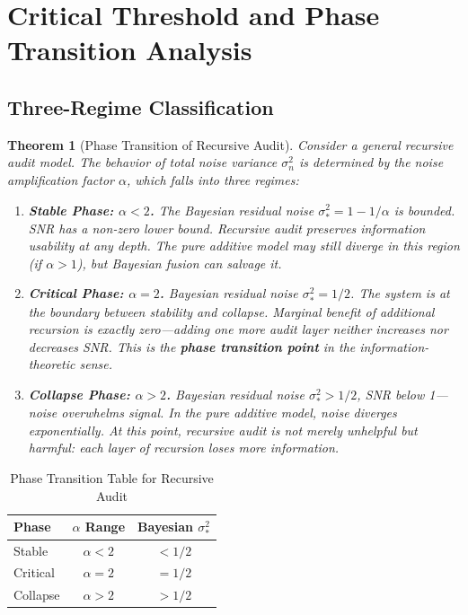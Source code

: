 \documentclass[12pt,a4paper]{article}
\newtheorem{theorem}{Theorem}[section]
\theoremstyle{definition}
\begin{document}
\section{Critical Threshold and Phase Transition Analysis}

\subsection{Three-Regime Classification}

\begin{theorem}[Phase Transition of Recursive Audit]\label{thm:phase_transition}
Consider a general recursive audit model. The behavior of total noise variance $\sigma_n^2$ is determined by the noise amplification factor $\alpha$, which falls into three regimes:

\begin{enumerate}[label=\textbf{Phase \arabic*}, leftmargin=*]
    \item \textbf{Stable Phase: $\alpha < 2$.}
    The Bayesian residual noise $\sigma_*^2 = 1 - 1/\alpha$ is bounded. SNR has a non-zero lower bound. Recursive audit preserves information usability at any depth. The pure additive model may still diverge in this region (if $\alpha > 1$), but Bayesian fusion can salvage it.

    \item \textbf{Critical Phase: $\alpha = 2$.}
    Bayesian residual noise $\sigma_*^2 = 1/2$. The system is at the boundary between stability and collapse. Marginal benefit of additional recursion is exactly zero---adding one more audit layer neither increases nor decreases SNR. This is the \textbf{phase transition point} in the information-theoretic sense.

    \item \textbf{Collapse Phase: $\alpha > 2$.}
    Bayesian residual noise $\sigma_*^2 > 1/2$, SNR below 1---noise overwhelms signal. In the pure additive model, noise diverges exponentially. At this point, recursive audit is not merely unhelpful but harmful: each layer of recursion loses more information.
\end{enumerate}
\end{theorem}

\begin{table}[htbp]
\centering
\caption{Phase Transition Table for Recursive Audit}
\label{tab:phase_transition}
\begin{tabular}{@{}lcc@{}}
\toprule
\textbf{Phase} & \textbf{$\alpha$ Range} & \textbf{Bayesian $\sigma_*^2$} \\
\midrule
Stable    & $\alpha < 2$ & $< 1/2$ \\
Critical  & $\alpha = 2$ & $= 1/2$ \\
Collapse  & $\alpha > 2$ & $> 1/2$ \\
\bottomrule
\end{tabular}
\end{table}
\end{document}
